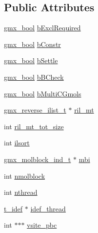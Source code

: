 \subsection*{\-Public \-Attributes}
\begin{DoxyCompactItemize}
\item 
\hyperlink{include_2types_2simple_8h_a8fddad319f226e856400d190198d5151}{gmx\-\_\-bool} \hyperlink{structgmx__reverse__top_afe003aabf1e7113266bcd39db94212b0}{b\-Excl\-Required}
\item 
\hyperlink{include_2types_2simple_8h_a8fddad319f226e856400d190198d5151}{gmx\-\_\-bool} \hyperlink{structgmx__reverse__top_a8b36671ae7ba18c5861964fee440d867}{b\-Constr}
\item 
\hyperlink{include_2types_2simple_8h_a8fddad319f226e856400d190198d5151}{gmx\-\_\-bool} \hyperlink{structgmx__reverse__top_a86d0b87bbc327335f1a0d8a2c7cc9452}{b\-Settle}
\item 
\hyperlink{include_2types_2simple_8h_a8fddad319f226e856400d190198d5151}{gmx\-\_\-bool} \hyperlink{structgmx__reverse__top_a0360615c00ab17951d323806c8f27fb3}{b\-B\-Check}
\item 
\hyperlink{include_2types_2simple_8h_a8fddad319f226e856400d190198d5151}{gmx\-\_\-bool} \hyperlink{structgmx__reverse__top_a4c80279ed5e40f6e80b3053de1eac600}{b\-Multi\-C\-Gmols}
\item 
\hyperlink{structgmx__reverse__ilist__t}{gmx\-\_\-reverse\-\_\-ilist\-\_\-t} $\ast$ \hyperlink{structgmx__reverse__top_ab540a03620dfe2f39b875e03bb581eca}{ril\-\_\-mt}
\item 
int \hyperlink{structgmx__reverse__top_aa219c2acdaedb02ad16451322e4e06cc}{ril\-\_\-mt\-\_\-tot\-\_\-size}
\item 
int \hyperlink{structgmx__reverse__top_a51462f666e8453869a908e06ab966eb4}{ilsort}
\item 
\hyperlink{structgmx__molblock__ind__t}{gmx\-\_\-molblock\-\_\-ind\-\_\-t} $\ast$ \hyperlink{structgmx__reverse__top_a35d94b53f08dfa5c421b1a402c248e85}{mbi}
\item 
int \hyperlink{structgmx__reverse__top_a99cbe7cee176426dfcc00bed0280c4d2}{nmolblock}
\item 
int \hyperlink{structgmx__reverse__top_a75ff0464a893802a3cf13dbc6c7ed580}{nthread}
\item 
\hyperlink{structt__idef}{t\-\_\-idef} $\ast$ \hyperlink{structgmx__reverse__top_a2f58e0afa503d0dbb8784b1a87117d46}{idef\-\_\-thread}
\item 
int $\ast$$\ast$$\ast$ \hyperlink{structgmx__reverse__top_a9ed29b12d49d58396dc83df1682d864c}{vsite\-\_\-pbc}

\end{DoxyCompactItemize}
